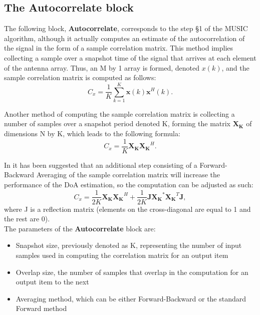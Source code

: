 \subsection{The Autocorrelate block}
The following block, \textbf{Autocorrelate}, corresponds to the step
\S1 of the MUSIC algorithm, although it actually computes an estimate of the
autocorrelation of the signal in the form of a sample correlation matrix. This
method implies collecting a sample over a snapshot time of the signal that
arrives at each element of the antenna array. Thus, an M by 1 array is formed,
denoted $x(k)$, and the sample correlation matrix is computed as follows:
\begin{equation}
C_x = \frac{1}{K}\sum_{k=1}^{K}\bm{x}(k)\bm{x}^H(k).
\end{equation}

Another method of computing the sample correlation matrix is collecting a number
of samples over a snapshot period denoted K, forming the matrix $\bm{X_K}$ of
dimensions N by K, which leads to the following formula:
\begin{equation}
C_x = \frac{1}{K}\bm{X_K}\bm{X_K}^H.
\label{eq:autocorr-first-part}
\end{equation}

In \cite{cite:FB-Averaging} it has been suggested that an additional step
consisting of a Forward-Backward Averaging of the sample correlation matrix will
increase the performance of the DoA estimation, so the computation can be
adjusted as such:
\begin{equation}
C_x = \frac{1}{2K}\bm{X_K}\bm{X_K}^H + \frac{1}{2K}\bm{J}\bm{X_K}^*\bm{X_K}^T\bm{J},
\end{equation}
where J is a reflection matrix (elements on the cross-diagonal are equal to 1
and the rest are 0). \\

The parameters of the \textbf{Autocorrelate} block are:
\begin{itemize}
    \item Snapshot size, previously denoted as K, representing the number of
    input samples used in computing the correlation matrix for an output item
    \item Overlap size, the number of samples that overlap in the computation
    for an output item to the next
    \item Averaging method, which can be either Forward-Backward or the standard
    Forward method
\end{itemize}

